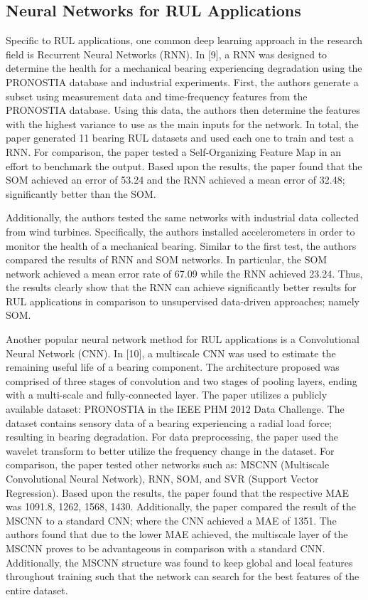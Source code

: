 \documentclass[journal]{IEEEtran}
\begin{document}
\subsection{Neural Networks for RUL Applications}


Specific to RUL applications, one common deep learning approach in the research field is Recurrent Neural Networks (RNN). In [9], a RNN was designed to determine the health for a mechanical bearing experiencing degradation using the PRONOSTIA database and industrial experiments. First, the authors generate a subset using measurement data and time-frequency features from the PRONOSTIA database. Using this data, the authors then determine the features with the highest variance to use as the main inputs for the network. In total, the paper generated 11 bearing RUL datasets and used each one to train and test a RNN. For comparison, the paper tested a Self-Organizing Feature Map in an effort to benchmark the output. Based upon the results, the paper found that the SOM achieved an error of 53.24 and the RNN achieved a mean error of 32.48; significantly better than the SOM. 

Additionally, the authors tested the same networks with industrial data collected from wind turbines. Specifically, the authors installed accelerometers in order to monitor the health of a mechanical bearing. Similar to the first test, the authors compared the results of RNN and SOM networks. In particular, the SOM network achieved a mean error rate of 67.09 while the RNN achieved 23.24. Thus, the results clearly show that the RNN can achieve significantly better results for RUL applications in comparison to unsupervised data-driven approaches; namely SOM. 

Another popular neural network method for RUL applications is a Convolutional Neural Network (CNN). In [10], a multiscale CNN was used to estimate the remaining useful life of a bearing component. The architecture proposed was comprised of three stages of convolution and two stages of pooling layers, ending with a multi-scale and fully-connected layer. The paper utilizes a publicly available dataset: PRONOSTIA in the IEEE PHM 2012 Data Challenge. The dataset contains sensory data of a bearing experiencing a radial load force; resulting in bearing degradation. For data preprocessing, the paper used the wavelet transform to better utilize the frequency change in the dataset. For comparison, the paper tested other networks such as: MSCNN (Multiscale Convolutional Neural Network), RNN, SOM, and SVR (Support Vector Regression). Based upon the results, the paper found that the respective MAE was 1091.8, 1262, 1568, 1430. Additionally, the paper compared the result of the MSCNN to a standard CNN; where the CNN achieved a MAE of 1351. The authors found that due to the lower MAE achieved, the multiscale layer of the MSCNN proves to be advantageous in comparison with a standard CNN. Additionally, the MSCNN structure was found to keep global and local features throughout training such that the network can search for the best features of the entire dataset.  
\end{document}
